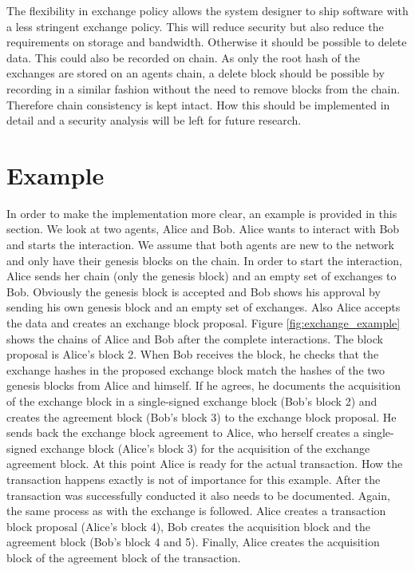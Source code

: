 The flexibility in exchange policy allows the system designer to ship software with a less stringent
exchange policy. This will reduce security but also reduce the requirements on storage and bandwidth.
Otherwise it should be possible to delete data. This could also be recorded on chain. As only the 
root hash of the exchanges are stored on an agents chain, a delete block should be possible by 
recording in a similar fashion without the need to remove blocks from the chain. Therefore chain 
consistency is kept intact. How this should be implemented in detail and a security analysis will 
be left for future research.

\section{Example}
In order to make the implementation more clear, an example is provided in this section. We look at two
agents, Alice and Bob. Alice wants to interact with Bob and starts the interaction. We assume that
both agents are new to the network and only have their genesis blocks on the chain. In order to
start the interaction, Alice sends her chain (only the genesis block) and an empty set of exchanges
to Bob. Obviously the genesis block is accepted and Bob shows his approval by sending his own
genesis block and an empty set of exchanges. Also Alice accepts the data and creates an exchange 
block proposal. Figure \ref{fig:exchange_example} shows the chains of Alice and Bob after the 
complete interactions. The block proposal is Alice's block 2. When Bob receives the block, he checks
that the exchange hashes in the proposed exchange block match the hashes of the two genesis blocks 
from Alice and himself. If he agrees, he documents the acquisition of the exchange block in a
single-signed exchange block (Bob's block 2) and creates the agreement block (Bob's block 3) to the exchange block proposal. He sends back the exchange block agreement to Alice, who herself creates a single-signed exchange block
(Alice's block 3) for the acquisition of the exchange agreement block. At this point Alice is ready for the actual 
transaction. How the transaction happens exactly is not of importance for this example. After the transaction was successfully conducted it also needs to be documented. Again,
the same process as with the exchange is followed. Alice creates a transaction block proposal (Alice's block 4), Bob
creates the acquisition block and the agreement block (Bob's block 4 and 5). Finally, Alice creates the acquisition block of the agreement block of the transaction.

